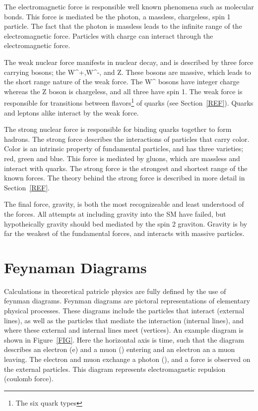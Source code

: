 The electromagnetic force is responsible well known phenomena such as molecular bonds.  
This force is mediated be the photon, a massless, chargeless, spin 1 particle.      
The fact that the photon is massless leads to the infinite range of the electromagnetic force.  
Particles with charge can interact through the electromagnetic force.


The weak nuclear force manifests in nuclear decay, and is described by three force carrying bosons; the W^+,W^-, and Z.  
These bosons are massive, which leads to the short range nature of the weak force.  
The W^{\pm} bosons have integer charge whereas the Z boson is chargeless, and all three have spin 1.  
The weak force is responsible for transitions between flavors\footnote{The six quark types} of quarks (see Section~\ref{REF}).
Quarks and leptons alike interact by the weak force.


The strong nuclear force is responsible for binding quarks together to form hadrons.  
The strong force describes the interactions of particles that carry color.  
Color is an intrinsic property of fundamental particles, and has three varieties; red, green and blue.
This force is mediated by gluons, which are massless and interact with quarks.  
The strong force is the strongest and shortest range of the known forces.  
The theory behind the strong force is described in more detail in Section~\ref{REF}.


The final force, gravity, is both the most recognizeable and least understood of the forces.  
All attempts at including gravity into the SM have failed, but hypotheically gravity should bed mediated by the spin 2 graviton.
Gravity is by far the weakest of the fundamental forces, and interacts with massive particles.

\section{Feynaman Diagrams}
Calculations in theoretical patricle physics are fully defined by the use of feynman diagrams.  
Feynman diagrams are pictoral representations of elementary physical processes.  
These diagrams include the particles that interact (external lines), as well as the particles that mediate the interaction (internal lines), 
and where these external and internal lines meet (vertices).
An example diagram is shown in Figure~\ref{FIG}.  
Here the horizontal axis is time, such that the diagram describes an electron (e) and a muon (\mu) entering and an electron an a muon leaving.  
The electron and muon exchange a photon (\gamma), and a force is observed on the external particles.
This diagram represents electromagnetic repulsion (coulomb force).  


